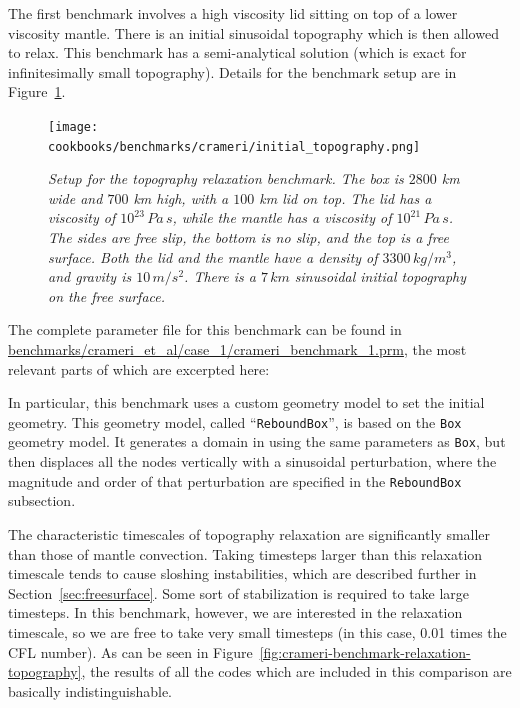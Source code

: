 \documentclass{article}
\begin{document}
The first benchmark involves a high viscosity lid sitting on top of a lower viscosity 
mantle. There is an initial sinusoidal topography which is then allowed to relax.
This benchmark has a semi-analytical solution (which is exact for infinitesimally small
topography). Details for the benchmark setup are in Figure~\ref{fig:crameri-benchmark-initial-topography}.


\begin{figure}
  \begin{center}
    \texttt{[image: cookbooks/benchmarks/crameri/initial\_topography.png]}
  \end{center}
  \caption{\it Setup for the topography relaxation benchmark. The box is $2800$ km wide and $700$ km high, with 
    a $100$ km lid on top. The lid has a viscosity of $10^{23} \, {Pa\,s}$, while the mantle has a viscosity of $10^{21} \, {Pa\,s}$.  The sides are 
    free slip, the bottom is no slip, and the top is a free surface.  Both the lid and the mantle have 
    a density of $3300 \,{kg/m^3}$, and gravity is $10 \, {m/s^2}$. There is a $7 \, {km}$ 
    sinusoidal initial topography on the free surface.}
  \label{fig:crameri-benchmark-initial-topography}
\end{figure}

The complete parameter file for this benchmark can be found in 
\url{benchmarks/crameri_et_al/case_1/crameri_benchmark_1.prm}, 
the  most relevant parts of which are excerpted here: 

In particular, this benchmark uses a custom geometry model to set the initial geometry. 
This geometry model, called ``\texttt{ReboundBox}'', is based on the \texttt{Box} geometry model. 
It generates a domain in using the same parameters as \texttt{Box}, but then displaces all 
the nodes vertically with a sinusoidal perturbation, where the magnitude and order of that 
perturbation are specified in the \texttt{ReboundBox} subsection.


The characteristic timescales of topography relaxation are significantly smaller than those of 
mantle convection. Taking timesteps larger than this relaxation timescale tends to cause sloshing
instabilities, which are described further in Section~\ref{sec:freesurface}. Some sort of stabilization 
is required to take large timesteps. In this benchmark, however, we are interested in the relaxation 
timescale, so we are free to take very small timesteps (in this case, 0.01 times the CFL 
number).  As can be seen in Figure~\ref{fig:crameri-benchmark-relaxation-topography}, the results of all the 
codes which are included in this comparison are basically indistinguishable.
\end{document}
